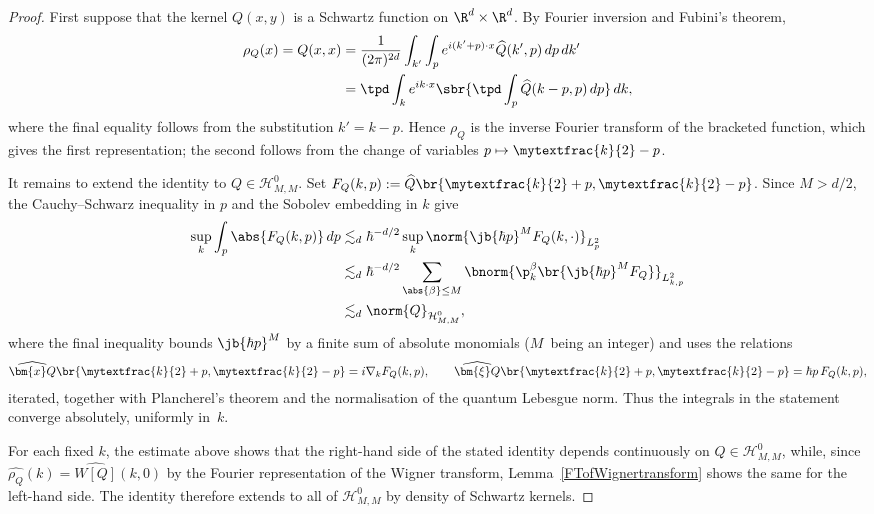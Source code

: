 \begin{proof}
First suppose that the kernel $Q(x,y)$ is a Schwartz function on $\R^d\times\R^d$. By Fourier inversion and Fubini's theorem,
\begin{align*}
\rho_Q(x)=Q(x,x)&=\frac{1}{(2\pi)^{2d}}\int_{k'}\int_p e^{i(k'+p)\cdot x}\widehat Q(k',p)\,dp\,dk'\\
&=\tpd\int_k e^{ik\cdot x}\sbr{\tpd\int_p\widehat Q(k-p,p)\,dp}\,dk,
\end{align*}
where the final equality follows from the substitution $k'=k-p$. Hence $\rho_Q$ is the inverse Fourier transform of the bracketed function, which gives the first representation; the second follows from the change of variables $p\mapsto\mytextfrac{k}{2}-p$.

It remains to extend the identity to $Q\in\mathcal H^0_{M,M}$. Set $F_Q(k,p):=\widehat Q\br{\mytextfrac{k}{2}+p,\mytextfrac{k}{2}-p}$. Since $M>d/2$, the Cauchy--Schwarz inequality in $p$ and the Sobolev embedding in $k$ give
\begin{align*}
\sup_k\int_p\abs{F_Q(k,p)}\,dp&\lesssim_d\hbar^{-d/2}\sup_k\norm{\jb{\hbar p}^{M}F_Q(k,\cdot)}_{L^2_p}\\
&\lesssim_d\hbar^{-d/2}\sum_{\abs{\beta}\leq M}\bnorm{\p_k^\beta\br{\jb{\hbar p}^{M}F_Q}}_{L^2_{k,p}}\\&\lesssim_d\norm{Q}_{\mathcal H^{0}_{M,M}},
\end{align*}
where the final inequality bounds $\jb{\hbar p}^{M}$ by a finite sum of absolute monomials ($M$~\hbox{being} an integer) and uses the relations
\begin{align*}
\widehat{\bm{x}Q}\br{\mytextfrac{k}{2}+p,\mytextfrac{k}{2}-p}=i\nabla_kF_Q(k,p),\qquad
\widehat{\bm{\xi}Q}\br{\mytextfrac{k}{2}+p,\mytextfrac{k}{2}-p}=\hbar p\,F_Q(k,p),
\end{align*}
iterated, together with Plancherel's theorem and the normalisation of the quantum Lebesgue norm. Thus the integrals in the statement converge absolutely, uniformly in~$k$.

For each fixed $k$, the estimate above shows that the right-hand side of the stated identity depends continuously on $Q\in\mathcal H^{0}_{M,M}$, while, since $\widehat{\rho_Q}(k)=\widehat{W[Q]}(k,0)$ by the Fourier representation of the Wigner transform, Lemma~\ref{FTofWignertransform} shows the same for the left-hand side. The identity therefore extends to all of $\mathcal H^{0}_{M,M}$ by density of Schwartz kernels.
\end{proof}

